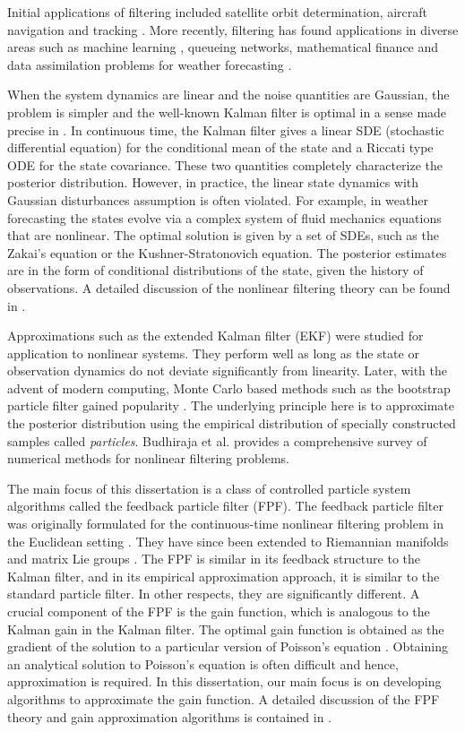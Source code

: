 Initial applications of filtering included satellite orbit determination, aircraft navigation and tracking \cite{kutsurpfi19}. More recently, filtering has found applications in diverse areas such as machine learning \cite{bishop06}, queueing networks, mathematical finance \cite{brihan08} and data assimilation problems for weather forecasting \cite{eve94}.

When the system dynamics are linear and the noise quantities are Gaussian, the problem is simpler and the well-known Kalman filter is optimal in a sense made precise in . In continuous time, the Kalman filter gives a linear SDE (stochastic differential equation) for the conditional mean of the state and a Riccati type ODE for the state covariance. These two quantities completely characterize the posterior distribution. However, in practice, the linear state dynamics with Gaussian disturbances assumption is often violated.  For example, in weather forecasting the states evolve via a complex system of fluid mechanics equations that are nonlinear. The optimal solution is given by a set of SDEs, such as the Zakai's equation or the Kushner-Stratonovich equation. The posterior estimates are in the form of conditional distributions of the state, given the history of observations. A detailed discussion of the nonlinear filtering theory can be found in \cite{baicri08}. 

Approximations such as the extended Kalman filter (EKF) were studied for application to nonlinear systems. They perform well as long as the state or observation dynamics do not deviate significantly from linearity. Later, with the advent of modern computing, Monte Carlo based methods such as the bootstrap particle filter gained popularity \cite{delmoral96}. The underlying principle here is to approximate the posterior distribution using the empirical distribution of specially constructed samples called \emph{particles}. Budhiraja et al. \cite{budchelee07} provides a comprehensive survey of numerical methods for nonlinear filtering problems. 

The main focus of this dissertation is a class of controlled particle system algorithms called the feedback particle filter (FPF). The feedback particle filter was originally formulated for the continuous-time nonlinear filtering problem in the Euclidean setting \cite{yanmehmey13}. They have since been extended to Riemannian manifolds and matrix Lie groups \cite{zhatagmeh16}. The FPF is similar in its feedback structure to the Kalman filter, and in its empirical approximation approach, it is similar to the standard particle filter. In other respects, they are significantly different. A crucial component of the FPF is the gain function, which is analogous to the Kalman gain in the Kalman filter. The optimal gain function is obtained as the gradient of the solution to a particular version of Poisson's equation \cite{yanmehmey13, laumehmeyrag14}. Obtaining an analytical solution to Poisson's equation is often difficult and hence, approximation is required. In this dissertation, our main focus is on developing algorithms to approximate the gain function. A detailed discussion of the FPF theory and gain approximation algorithms is contained in . 


